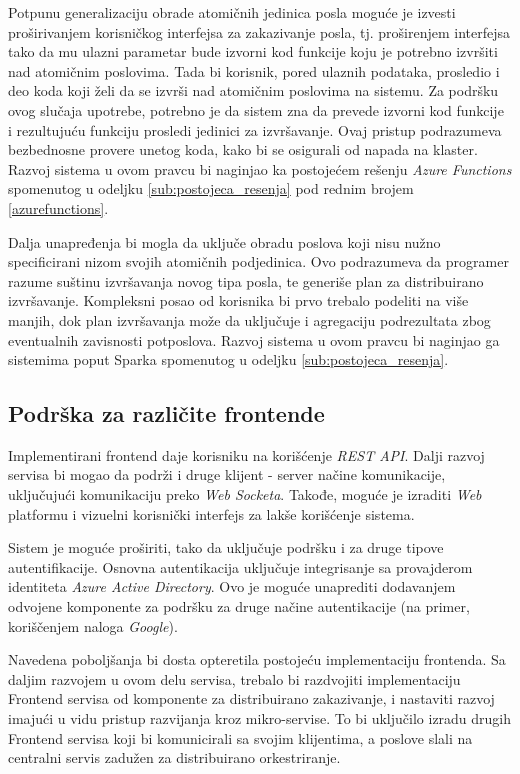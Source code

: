 \documentclass[12pt,oneside]{memoir}
\begin{document}
Potpunu generalizaciju obrade atomičnih jedinica posla moguće je izvesti proširivanjem korisničkog interfejsa za zakazivanje posla, tj. proširenjem interfejsa tako da mu ulazni parametar bude izvorni kod funkcije koju je potrebno izvršiti nad atomičnim poslovima. Tada bi korisnik, pored ulaznih podataka, prosledio i deo koda koji želi da se izvrši nad atomičnim poslovima na sistemu. Za podršku ovog slučaja upotrebe, potrebno je da sistem zna da prevede izvorni kod funkcije i rezultujuću funkciju prosledi jedinici za izvršavanje. Ovaj pristup podrazumeva bezbednosne provere unetog koda, kako bi se osigurali od napada na klaster. Razvoj sistema u ovom pravcu bi naginjao ka postojećem rešenju \emph{Azure Functions} spomenutog u odeljku \ref{sub:postojeca_resenja} pod rednim brojem \ref{azurefunctions}.

Dalja unapređenja bi mogla da uključe obradu poslova koji nisu nužno specificirani nizom svojih atomičnih podjedinica. Ovo podrazumeva da programer razume suštinu izvršavanja novog tipa posla, te generiše plan za distribuirano izvršavanje. Kompleksni posao od korisnika bi prvo trebalo podeliti na više manjih, dok plan izvršavanja može da uključuje i agregaciju podrezultata zbog eventualnih zavisnosti potposlova. Razvoj sistema u ovom pravcu bi naginjao ga sistemima poput Sparka \cite{Spark} spomenutog u odeljku \ref{sub:postojeca_resenja}.

\subsection{Podrška za različite frontende}

Implementirani frontend daje korisniku na korišćenje \emph{REST API}. Dalji razvoj servisa bi mogao da podrži i druge klijent - server načine komunikacije, uključujući komunikaciju preko \emph{Web Socketa}. Takođe, moguće je izraditi \emph{Web} platformu i vizuelni korisnički interfejs za lakše korišćenje sistema.

Sistem je moguće proširiti, tako da uključuje podršku i za druge tipove autentifikacije. Osnovna autentikacija uključuje integrisanje sa provajderom identiteta \emph{Azure Active Directory}. Ovo je moguće unaprediti dodavanjem odvojene komponente za podršku za druge načine autentikacije (na primer, koriščenjem naloga \emph{Google}).

Navedena poboljšanja bi dosta opteretila postojeću implementaciju frontenda. Sa daljim razvojem u ovom delu servisa, trebalo bi razdvojiti implementaciju Frontend servisa od komponente za distribuirano zakazivanje, i nastaviti razvoj imajući u vidu pristup razvijanja kroz mikro-servise. To bi uključilo izradu drugih Frontend servisa koji bi komunicirali sa svojim klijentima, a poslove slali na centralni servis zadužen za distribuirano orkestriranje.
\end{document}
